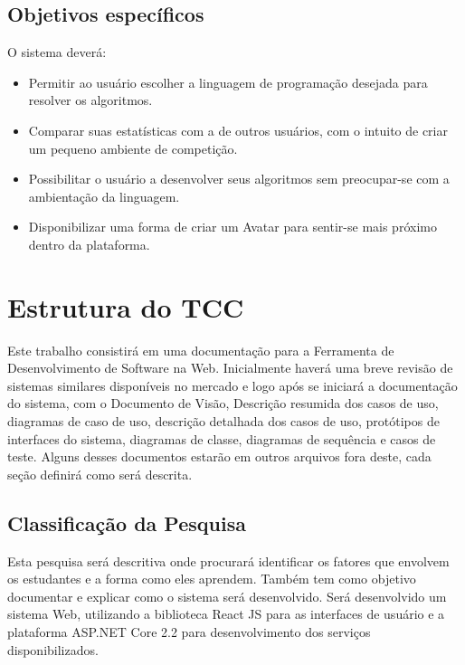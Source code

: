 \subsection{Objetivos específicos}
O sistema deverá:
\begin{itemize}
	\item Permitir ao usuário escolher a linguagem de programação desejada para resolver os algoritmos.
	\item Comparar suas estatísticas com a de outros usuários, com o intuito de criar um pequeno ambiente de competição.
	\item Possibilitar o usuário a desenvolver seus algoritmos sem preocupar-se com a ambientação da linguagem.
	\item Disponibilizar uma forma de criar um Avatar para sentir-se mais próximo dentro da plataforma.
\end{itemize}


\section{Estrutura do TCC}
Este trabalho consistirá em uma documentação para a Ferramenta de Desenvolvimento de Software na Web.
Inicialmente haverá uma breve revisão de sistemas similares disponíveis no mercado e logo após se iniciará a documentação do sistema, com o Documento de Visão, Descrição resumida dos casos de uso, diagramas de caso de uso, descrição detalhada dos casos de uso, protótipos de interfaces do sistema, diagramas de classe, diagramas de sequência e casos de teste.
Alguns desses documentos estarão em outros arquivos fora deste, cada seção definirá como será descrita.

\subsection{Classificação da Pesquisa}
Esta pesquisa será descritiva onde procurará identificar os fatores que envolvem os estudantes e a forma como eles aprendem. Também tem como objetivo documentar e explicar como o sistema será desenvolvido.
Será desenvolvido um sistema Web, utilizando a biblioteca React JS para as interfaces de usuário e a plataforma ASP.NET Core 2.2 para desenvolvimento dos serviços disponibilizados.
